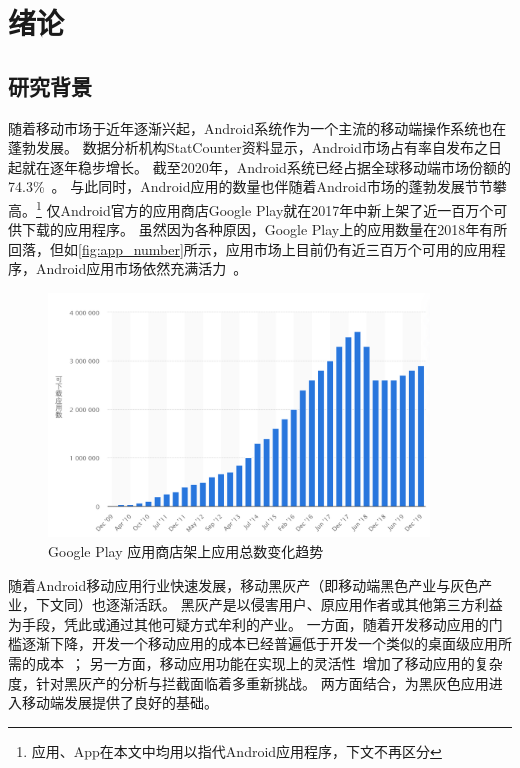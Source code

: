 \chapter {绪论}
\label{chp:intro}

\section{研究背景}

随着移动市场于近年逐渐兴起，Android系统作为一个主流的移动端操作系统也在蓬勃发展。
数据分析机构StatCounter资料显示，Android市场占有率自发布之日起就在逐年稳步增长。
截至2020年，Android系统已经占据全球移动端市场份额的74.3\%~\cite{MobileOSMktShare}。
与此同时，Android应用的数量也伴随着Android市场的蓬勃发展节节攀高。\footnote{应用、App在本文中均用以指代Android应用程序，下文不再区分}
仅Android官方的应用商店Google Play就在2017年中新上架了近一百万个可供下载的应用程序。
虽然因为各种原因，Google Play上的应用数量在2018年有所回落，但如\autoref{fig:app_number}所示，应用市场上目前仍有近三百万个可用的应用程序，Android应用市场依然充满活力~\cite{StatistaAppNumber}。

\begin{figure}[htbp]
	\centering
	\includegraphics[width=0.9\textwidth]{./Figures/edwin-intro-app-number.png}
	\caption{Google Play 应用商店架上应用总数变化趋势}
	\label{fig:app_number}
\end{figure}

随着Android移动应用行业快速发展，移动黑灰产（即移动端黑色产业与灰色产业，下文同）也逐渐活跃。
黑灰产是以侵害用户、原应用作者或其他第三方利益为手段，凭此或通过其他可疑方式牟利的产业。
一方面，随着开发移动应用的门槛逐渐下降，开发一个移动应用的成本已经普遍低于开发一个类似的桌面级应用所需的成本~\cite{wasserman2010software}；
另一方面，移动应用功能在实现上的灵活性~\cite{storydroid}增加了移动应用的复杂度，针对黑灰产的分析与拦截面临着多重新挑战。
两方面结合，为黑灰色应用进入移动端发展提供了良好的基础。

